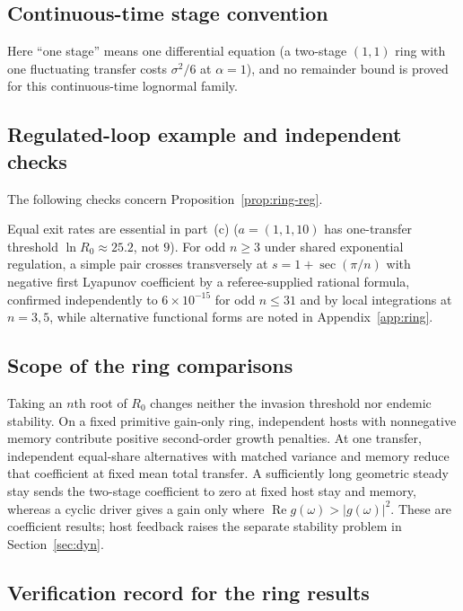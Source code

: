 \subsection{Continuous-time stage convention}\label{esm:ring-ct-example}

Here ``one stage'' means one differential equation (a two-stage $(1,1)$ ring with one fluctuating transfer costs $\sigma^2/6$ at $\alpha = 1$), and no remainder bound is proved for this continuous-time lognormal family.

\subsection{Regulated-loop example and independent checks}\label{esm:ring-reg-checks}

The following checks concern Proposition~\ref{prop:ring-reg}.

Equal exit rates are essential in part~(c) ($a = (1, 1, 10)$ has one-transfer threshold $\ln R_0 \approx 25.2$, not $9$). For odd $n \ge 3$ under shared exponential regulation, a simple pair crosses transversely at $s = 1 + \sec(\pi/n)$ with negative first Lyapunov coefficient by a referee-supplied rational formula, confirmed independently to $6 \times 10^{-15}$ for odd $n \le 31$ and by local integrations at $n = 3, 5$, while alternative functional forms are noted in Appendix~\ref{app:ring}.

\subsection{Scope of the ring comparisons}\label{esm:ring-comparison-scope}

Taking an $n$th root of $R_0$ changes neither the invasion threshold nor endemic stability. On a fixed primitive gain-only ring, independent hosts with nonnegative memory contribute positive second-order growth penalties. At one transfer, independent equal-share alternatives with matched variance and memory reduce that coefficient at fixed mean total transfer. A sufficiently long geometric steady stay sends the two-stage coefficient to zero at fixed host stay and memory, whereas a cyclic driver gives a gain only where $\operatorname{Re}g(\omega)>|g(\omega)|^2$. These are coefficient results; host feedback raises the separate stability problem in Section~\ref{sec:dyn}.

\subsection{Verification record for the ring results}\label{esm:ring-verification}

